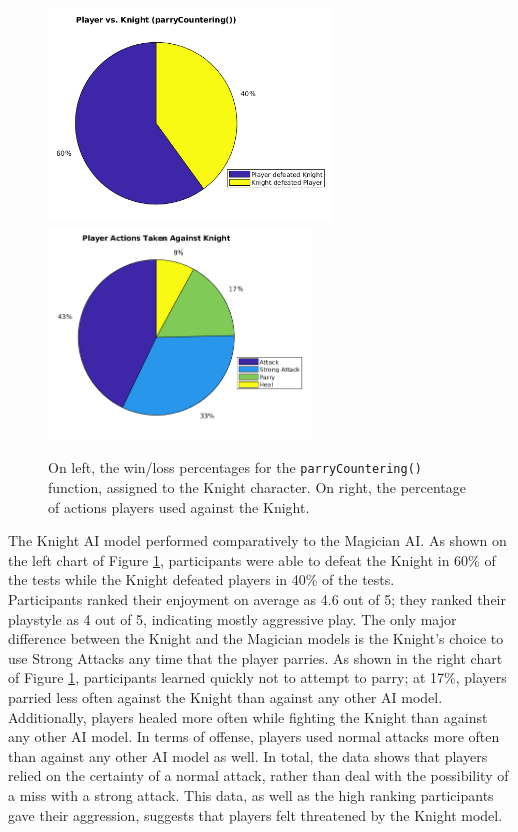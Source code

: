\begin{figure}[H]
  \centering
  \includegraphics[width=7.5cm]{figures/knightWins.png}
  \includegraphics[width=7cm]{figures/actionsKnight.png}
  \caption{On left, the win/loss percentages for the \texttt{parryCountering()}  function, assigned to the Knight character. On right, the percentage of actions players used against the Knight.}
  \label{fig:pieKnight}
\end{figure}

The Knight AI model performed comparatively to the Magician AI. As shown on the left chart of Figure \ref{fig:pieKnight}, participants were able to defeat the Knight in 60\% of the tests while the Knight defeated players in 40\% of the tests.\\

Participants ranked their enjoyment on average as 4.6 out of 5; they ranked their playstyle as 4 out of 5, indicating mostly aggressive play. The only major difference between the Knight and the Magician models is the Knight's choice to use Strong Attacks any time that the player parries. As shown in the right chart of Figure \ref{fig:pieKnight}, participants learned quickly not to attempt to parry; at 17\%, players parried less often against the Knight than against any other AI model. Additionally, players healed more often while fighting the Knight than against any other AI model. In terms of offense, players used normal attacks more often than against any other AI model as well. In total, the data shows that players relied on the certainty of a normal attack, rather than deal with the possibility of a miss with a strong attack. This data, as well as the high ranking participants gave their aggression, suggests that players felt threatened by the Knight model.

